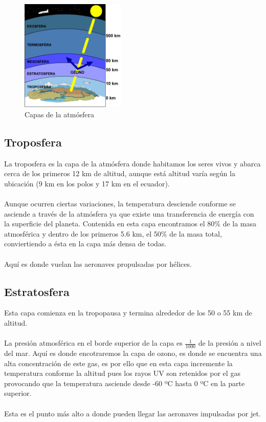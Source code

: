 \documentclass{article}
\begin{document}
\begin{figure}
    \centering
    \includegraphics[width=5cm]{CapasAtmosfera}
    \caption{Capas de la atmósfera}
\label{Atmosfera}
\end{figure}

    \subsection{Troposfera}
    
    La troposfera es la capa de la atmósfera donde habitamos los seres             vivos y abarca cerca de los primeros 12 km de altitud, aunque está             altitud varía según la ubicación (9 km en los polos y 17 km en el               ecuador).
    \\
    \\ Aunque ocurren ciertas variaciones, la temperatura desciende                 conforme se asciende a través de la atmósfera ya que existe una                 transferencia de energía con la superficie del planeta. Contenida en           esta capa encontramos el 80\% de la masa atmosférica y dentro de los           primeros 5.6 km, el 50\% de la masa total, conviertiendo a ésta en la           capa más densa de todas.
    \\
    \\ Aquí es donde vuelan las aeronaves propulsadas por hélices.
    
    \subsection{Estratosfera}
    
    Esta capa comienza en la tropopausa y termina alrededor de los 50 o 55         km de altitud.
    \\
    \\ La presión atmosférica en el borde superior de la capa es $\frac{1}         {1000}$ de la presión a nivel del mar. Aquí es donde encotraremos la           capa de ozono, es donde se encuentra una alta concentración de este             gas, es por ello que en esta capa incremente la temperatura conforme la         altitud pues los rayos UV son retenidos por el gas provocando que la           temperatura asciende desde -60 ºC hasta 0 ºC en la parte superior.
    \\
    \\ Esta es el punto más alto a donde pueden llegar las aeronaves               impulsadas por jet.
    
\end{document}
